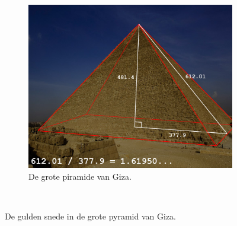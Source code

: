\documentclass{article}
\begin{document}
\begin{figure}[Hh]
    \centering
	\begin{subfigure}[b]{0.5\textwidth}
        \includegraphics[width=\textwidth]{pyramid.jpg}
        \caption{De grote piramide van Giza.}
        \label{fig:giza}
    \end{subfigure}
    ~ 
    \caption{De gulden snede in de grote pyramid van Giza.}
    \label{fig:animals}
\end{figure}
\end{document}

